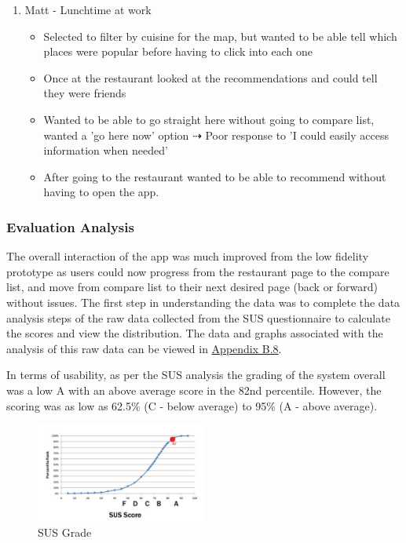 \documentclass[a4 paper, 12pt]{article}
\begin{document}
\begin{enumerate}
            \item Matt - Lunchtime at work
                \begin{itemize}
                    \item Selected to filter by cuisine for the map, but wanted to be able tell which places were popular before having to click into each one
                    \item Once at the restaurant looked at the recommendations and could tell they were friends
                    \item Wanted to be able to go straight here without going to compare list, wanted a 'go here now' option $\dashrightarrow$ Poor response to 'I could easily access information when needed'
                    \item After going to the restaurant wanted to be able to recommend without having to open the app.
                \end{itemize}
        \end{enumerate}

    \subsubsection{Evaluation Analysis}
    The overall interaction of the app was much improved from the low fidelity prototype as users could now progress from the restaurant page to the compare list, and move from compare list to their next desired page (back or forward) without issues. The first step in understanding the data was to complete the data analysis steps of the raw data collected from the SUS questionnaire to calculate the scores and view the distribution. The data and graphs associated with the analysis of this raw data can be viewed in \hyperref[sec:B.8]{Appendix B.8}.

    In terms of usability, as per the SUS analysis the grading of the system overall was a low A with an above average score in the 82nd percentile. However, the scoring was as low as 62.5\% (C - below average) to 95\% (A - above average). 
    \begin{figure}[H]
        \centering
        \includegraphics[width=0.5\textwidth, frame]
            {./Med_Fidelity/Med_Report/images/Med_SUS_Grade.PNG} 
        \caption{SUS Grade}
    \end{figure}   
        
\end{document}
